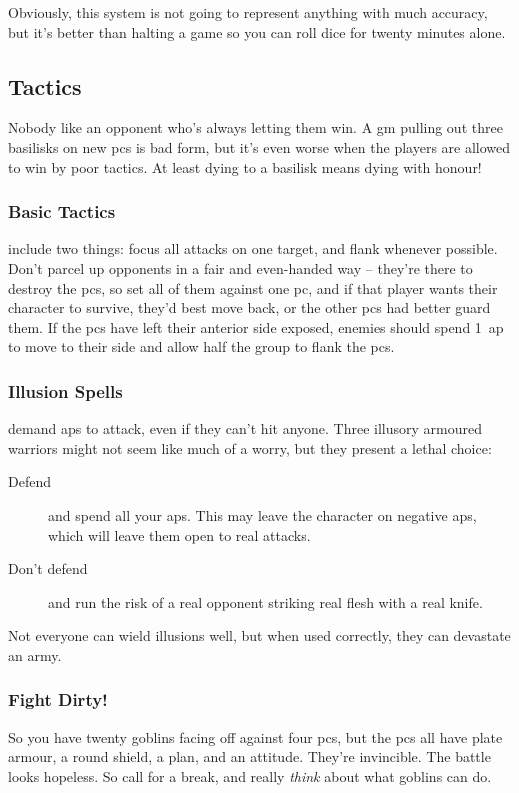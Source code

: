 \begin{multicols}{2}
Obviously, this system is not going to represent anything with much accuracy, but it's better than halting a game so you can roll dice for twenty minutes alone.

\subsection{Tactics}

Nobody like an opponent who's always letting them win.
A \gls{gm} pulling out three \glspl{basilisk} on new \glspl{pc} is bad form, but it's even worse when the players are allowed to win by poor tactics.
At least dying to a basilisk means dying with honour!

\subsubsection{Basic Tactics}
include two things: focus all attacks on one target, and flank whenever possible.
Don't parcel up opponents in a fair and even-handed way -- they're there to destroy the \glspl{pc}, so set all of them against one \gls{pc}, and if that player wants their character to survive, they'd best move back, or the other \glspl{pc} had better guard them.%
If the \glspl{pc} have left their anterior side exposed, enemies should spend 1~\gls{ap} to move to their side and allow half the group to flank the \glspl{pc}.

\subsubsection{Illusion Spells}
demand \glspl{ap} to attack, even if they can't hit anyone.
Three illusory armoured warriors might not seem like much of a worry, but they present a lethal choice:

\begin{description}
  \item[Defend]
  and spend all your \glspl{ap}.
  This may leave the character on negative \glspl{ap}, which will leave them open to real attacks.
  \item[Don't defend]
  and run the risk of a real opponent striking real flesh with a real knife. 
\end{description}

Not everyone can wield illusions well, but when used correctly, they can devastate an army.

\subsubsection{Fight Dirty!}
So you have twenty goblins facing off against four \glspl{pc}, but the \glspl{pc} all have plate armour, a round shield, a plan, and an attitude.
They're invincible.
The battle looks hopeless.
So call for a break, and really \textit{think} about what goblins can do.


\end{multicols}

